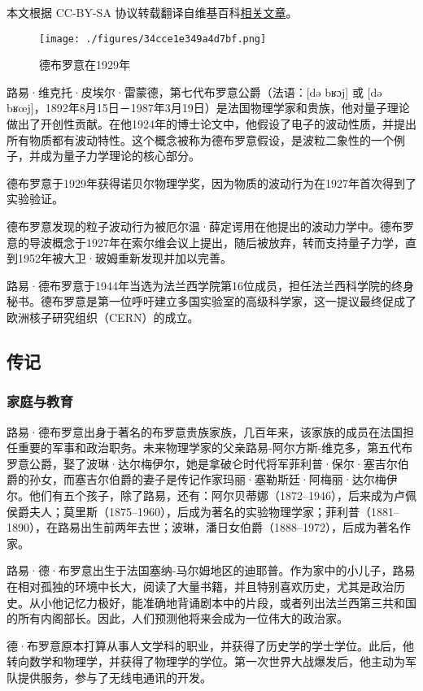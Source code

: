 
本文根据 CC-BY-SA 协议转载翻译自维基百科\href{https://en.wikipedia.org/wiki/Louis_de_Broglie}{相关文章}。

\begin{figure}[ht]
\centering
\texttt{[image: ./figures/34cce1e349a4d7bf.png]}
\caption{德布罗意在1929年} \label{fig_Brogli_1}
\end{figure}
路易·维克托·皮埃尔·雷蒙德，第七代布罗意公爵（法语：[də bʁɔj] 或 [də bʁœj]，1892年8月15日－1987年3月19日）是法国物理学家和贵族，他对量子理论做出了开创性贡献。在他1924年的博士论文中，他假设了电子的波动性质，并提出所有物质都有波动特性。这个概念被称为德布罗意假设，是波粒二象性的一个例子，并成为量子力学理论的核心部分。

德布罗意于1929年获得诺贝尔物理学奖，因为物质的波动行为在1927年首次得到了实验验证。

德布罗意发现的粒子波动行为被厄尔温·薛定谔用在他提出的波动力学中。德布罗意的导波概念于1927年在索尔维会议上提出，随后被放弃，转而支持量子力学，直到1952年被大卫·玻姆重新发现并加以完善。

路易·德布罗意于1944年当选为法兰西学院第16位成员，担任法兰西科学院的终身秘书。德布罗意是第一位呼吁建立多国实验室的高级科学家，这一提议最终促成了欧洲核子研究组织（CERN）的成立。
\subsection{传记}  
\subsubsection{家庭与教育}
路易·德布罗意出身于著名的布罗意贵族家族，几百年来，该家族的成员在法国担任重要的军事和政治职务。未来物理学家的父亲路易-阿尔方斯-维克多，第五代布罗意公爵，娶了波琳·达尔梅伊尔，她是拿破仑时代将军菲利普·保尔·塞吉尔伯爵的孙女，而塞吉尔伯爵的妻子是传记作家玛丽·塞勒斯廷·阿梅丽·达尔梅伊尔。他们有五个孩子，除了路易，还有：阿尔贝蒂娜（1872–1946），后来成为卢佩侯爵夫人；莫里斯（1875–1960），后成为著名的实验物理学家；菲利普（1881–1890），在路易出生前两年去世；波琳，潘日女伯爵（1888–1972），后成为著名作家。

路易·德·布罗意出生于法国塞纳-马尔姆地区的迪耶普。作为家中的小儿子，路易在相对孤独的环境中长大，阅读了大量书籍，并且特别喜欢历史，尤其是政治历史。从小他记忆力极好，能准确地背诵剧本中的片段，或者列出法兰西第三共和国的所有内阁部长。因此，人们预测他将来会成为一位伟大的政治家。

德·布罗意原本打算从事人文学科的职业，并获得了历史学的学士学位。此后，他转向数学和物理学，并获得了物理学的学位。第一次世界大战爆发后，他主动为军队提供服务，参与了无线电通讯的开发。
